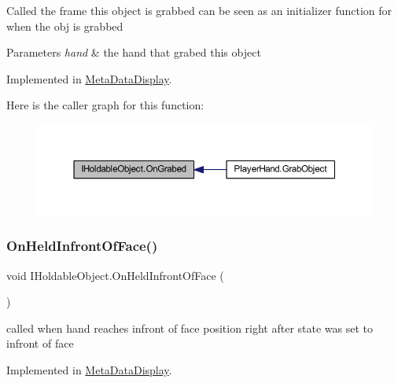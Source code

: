 Called the frame this object is grabbed can be seen as an initializer function for when the obj is grabbed 


\begin{DoxyParams}{Parameters}
{\em hand} & the hand that grabed this object\\
\hline
\end{DoxyParams}


Implemented in \mbox{\hyperlink{class_meta_data_display_a7d639d7bc58c9340a7f5274884bbc11d}{Meta\+Data\+Display}}.

Here is the caller graph for this function\+:
\nopagebreak
\begin{figure}[H]
\begin{center}
\leavevmode
\includegraphics[width=350pt]{interface_i_holdable_object_a7b8a42a0c12a26b1668c4dd904f38355_icgraph}
\end{center}
\end{figure}
\mbox{\label{interface_i_holdable_object_a6f63fec8fb8f715ad5cdd08aa5ec0ea5}} 
\subsubsection{\texorpdfstring{On\+Held\+Infront\+Of\+Face()}{OnHeldInfrontOfFace()}}
{\footnotesize\ttfamily void I\+Holdable\+Object.\+On\+Held\+Infront\+Of\+Face (\begin{DoxyParamCaption}{ }\end{DoxyParamCaption})}



called when hand reaches infront of face position right after state was set to infront of face 



Implemented in \mbox{\hyperlink{class_meta_data_display_ab91c62e23ca6af27f8a30859d5a172c9}{Meta\+Data\+Display}}.

